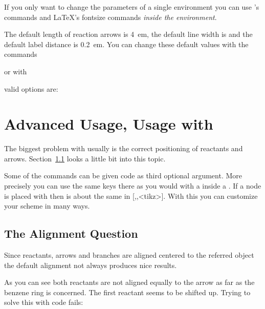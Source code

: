 \documentclass[toc=index,DIV10]{cnpkgdoc}
\begin{document}
If you only want to change the parameters of a single environment you can use
's commands and \LaTeX's fontsize commands \emph{inside the
environment}.
\begin{beispiel}
 \begin{rxn}
  \setatomsep{2.1em}\setcrambond{5pt}{1pt}{2pt}\Large
 \end{rxn}
 \begin{rxn}
 \end{rxn}
\end{beispiel}

The default length of reaction arrows is \SI{4}{em}, the default line width is
 and the default label distance is \SI{0.2}{em}. You can change
these default values with the commands
\begin{beschreibung}
\end{beschreibung}
or with
\begin{beschreibung}
  valid options are:
\end{beschreibung}

\section{Advanced Usage, Usage with \TikZ}
The biggest problem with \mychemistry usually is the correct positioning of
reactants and arrows. Section~\ref{ssec:ausrichtungsfrage} looks a little bit
into this topic.

Some of the commands can be given \TikZ code as third optional argument. More
precisely you can use the same \TikZ keys there as you would with a 
inside a . If a node is placed with %
 then  is about the same in \eg
{}[,,<tikz>]{}. With this you can customize your scheme in many ways.

\subsection{The Alignment Question}\label{ssec:ausrichtungsfrage}
Since reactants, arrows and branches are aligned centered to the referred object
the default alignment not always produces nice results.
\begin{beispiel}
 \makevisible
 \begin{rxn}
  \arrow{}{}
 \end{rxn}
\end{beispiel}
As you can see both reactants are not aligned equally to the arrow as far as the
benzene ring is concerned. The first reactant seems to be shifted up. Trying to
solve this with \TikZ code fails:
\end{document}
